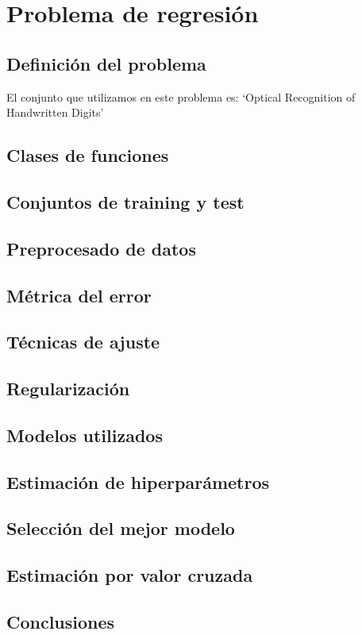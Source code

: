 \chapter{Problema de regresión}
\section{Definición del problema}
El conjunto que utilizamos en este problema es: `Optical Recognition of Handwritten Digits'
\section{Clases de funciones}
\section{Conjuntos de training y test}
\section{Preprocesado de datos}
\section{Métrica del error}
\section{Técnicas de ajuste}
\section{Regularización}
\section{Modelos utilizados}
\section{Estimación de hiperparámetros}
\section{Selección del mejor modelo}
\section{Estimación por valor cruzada}
\section{Conclusiones}
